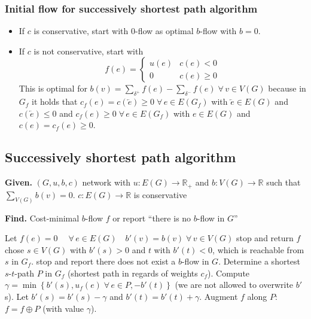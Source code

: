 \documentclass{article}
\newcommand{\set}[1]{\left\{#1\right\}}
\newcommand{\given}[1]{\textbf{Given.} #1\par}
\newcommand{\find}[1]{\textbf{Find.} #1\par}
\newcommand{\gath}[2]{$#1$-$#2$-path} %
\newcommand{\fall}{\;\forall\,}
\begin{document}
\subsubsection{Initial flow for successively shortest path algorithm}
\begin{itemize}
  \item If $c$ is conservative, start with $0$-flow as optimal $b$-flow with $b=0$.
  \item If $c$ is not conservative, start with \[
      f(e) = \left\{\begin{array}{cc}
        u(e) & c(e) < 0 \\
        0    & c(e) \geq 0
      \end{array}\right.
    \]
    This is optimal for $b(v) = \sum_{\delta^+} f(e) - \sum_{\delta^-} f(e) \fall v \in V(G)$ because in $G_f$ it holds that $c_f(e) = c(\overleftarrow{e}) \geq 0 \fall e \in E(G_f)$ with $\overleftarrow{e} \in E(G)$ and $c(\overleftarrow{e}) \leq 0$ and $c_f(e) \geq 0 \fall e \in E(G_f)$ with $e \in E(G)$ and $c(e) = c_f(e) \geq 0$.
\end{itemize}

\subsection{Successively shortest path algorithm}
%
\begin{algorithm}
  \caption{Successively shortest path algorithm}
  \label{succ-shortest-path-algo}
  \given{$(G, u, b, c)$ network with $u: E(G) \rightarrow \mathbb{R}_+$ and $b: V(G) \rightarrow \mathbb{R}$ such that $\sum_{V(G)} b(v) = 0$. $c: E(G) \rightarrow \mathbb{R}$ is conservative}
  \find{Cost-minimal $b$-flow $f$ or report ``there is no $b$-flow in $G$''}
\begin{algorithmic}[1]
  \State Let $f(e) = 0 \quad \fall e \in E(G) \quad b'(v) = b(v) \fall v \in V(G)$
    \If{$b'(v) = 0 \fall v \in V(G)$}\label{ssp-algo-step-2}
      \State stop and return $f$
    \Else
      \State chose $s \in V(G)$ with $b'(s) > 0$ and $t$ with $b'(t) < 0$, which is reachable from $s$ in $G_f$.
        \State stop and report there does not exist a $b$-flow in $G$.
      \EndIf
    \EndIf
  \State Determine a shortest \gath st $P$ in $G_f$ (shortest path in regards of weights $c_f$).
  \State Compute $\gamma = \min\set{b'(s), u_f(e) \fall e \in P, -b'(t)}$ (we are not allowed to overwrite $b'$s).
  \State Let $b'(s) = b'(s) - \gamma$ and $b'(t) = b'(t) + \gamma$.
  \State Augment $f$ along $P$: $f = f \oplus P$ (with value $\gamma$).
\end{algorithmic}
\end{algorithm}
\end{document}
